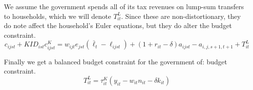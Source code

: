\documentclass[letterpaper,12pt]{article}
\theoremstyle{definition}
\numberwithin{equation}{section}
\begin{document}
\begin{spacing}{1.5}
	We assume the government spends all of its tax revenues on lump-sum transfers to households, which we will denote $T^L_{it}$.  Since these are non-distortionary, they do note affect the household's Euler equations, but they do alter the budget constraint.
	\begin{equation} \nonumber
		c_{ijst} + KID_{ist}c^K_{ijst} = w_{ijt} e_{jst} (\bar \ell_t -\ell_{ijst}) + (1+r_{it}-\delta)a_{ijst} - a_{i,j,s+1,t+1} + T^L_{it}
	\end{equation}

	Finally we get a balanced budget constraint for the government of:
	budget constraint.
	\begin{equation} \nonumber
		T^L_{it} = \tau^K_{it} (y_{it} - w_{it}n_{it} - \delta k_{it})
	\end{equation}


\end{spacing}
\end{document}
